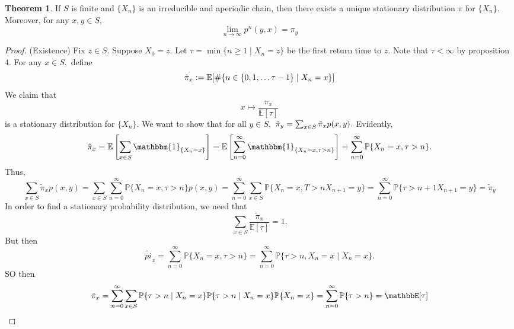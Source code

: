 \documentclass[10pt, oneside]{article}
\newcommand{\bbP}{\mathbb{P}}
\newcommand{\bbE}{\mathbb{E}}
\theoremstyle{definition}
\newtheorem{thm}{Theorem}
\begin{document}
\begin{thm}
    If $S$ is finite and $\{X_n\}$ is an irreducible and aperiodic chain, then there exists a unique stationary distribution $\pi$ for $\{X_n\}.$ Moreover, for any $x,y \in S,$ \[\lim_{n\to \infty}p^n(y,x) = \pi_y\]
\end{thm}

\begin{proof}
    (Existence) Fix $z \in S.$ Suppose $X_0 = z.$ Let $\tau = \min\{n \geq 1 \mid X_n = z\}$ be the first return time to $z.$ Note that $\tau < \infty $ by proposition $4.$ For any $x\in S,$ define
    \[\Tilde{\pi}_x := \mathbb{E}[ \#\{n \in \{0,1, \dots \tau - 1\} \mid X_n = x\}]\] 
    We claim that 
    \[x \mapsto \frac{\pi_x}{\bbE[\tau]}\] is a stationary distribution for $\{X_n\}.$ We want to show that for all $y \in S,$ $\tilde{\pi}_y = \sum_{x\in S} \Tilde{\pi}_x p(x,y).$ Evidently, 
    \[\tilde{\pi}_x = \mathbb{E}\left[\sum_{x\in S}\mathbbm{1}_{\{X_n = x\}}\right] = \mathbb{E} \left[\sum_{n = 0}^\infty \mathbbm{1}_{\{X_n = x, \tau >n\}}\right] = \sum_{n =0}^\infty \bbP\{X_n = x, \tau >n\}.\] Thus, 
    \[\sum_{x\in S}\tilde{\pi}_x p(x,y) = \sum_{x\in S}\sum_{n = 0}^\infty \bbP\{X_n = x, \tau >n\} p(x,y) = \sum_{n = 0}^\infty \sum_{x\in S} \bbP\{X_n = x, T >n X_{n + 1}  = y\} = \sum_{n = 0}^\infty \bbP\{\tau >{n + 1}X_{n + 1} = y\} = \tilde{\pi}_y\]
    In order to find a stationary probability distribution, we need that 
    \[\sum_{x\in S} \frac{\tilde{\pi}_x}{\mathbb{E}[\tau]} = 1.\] But then 
    \[\tilde{pi}_x = \sum_{n = 0}^\infty \bbP\{X_n = x , \tau >n\} = \sum_{n = 0}^\infty \bbP\{\tau > n, X_n = x \mid X_n = x\}.\] SO then 
    \[\tilde{\pi}_x  = \sum_{n  = 0}^\infty \sum_{x\in S}\bbP\{\tau > n  \mid X_n = x\}\bbP\{\tau  > n \mid X_n  = x\}\bbP\{X_n = x\} = \sum_{n = 0}^\infty \bbP\{\tau >n\} = \mathbbE[\tau]\]
\end{proof}
\end{document}

